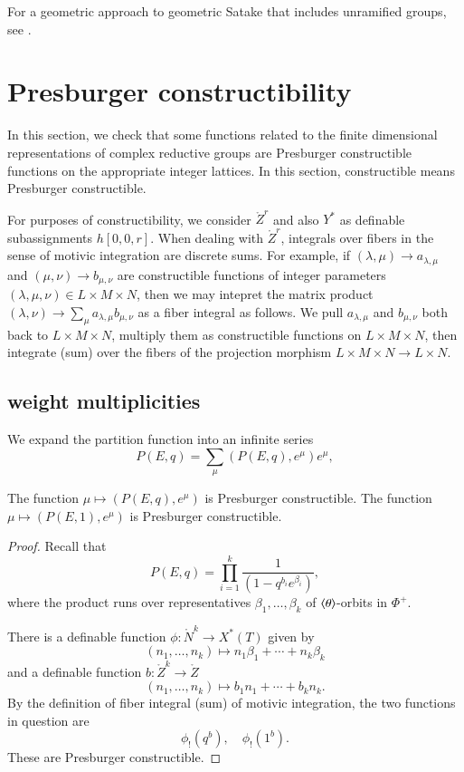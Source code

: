 For a geometric approach to geometric Satake that includes unramified groups, see \cite{zhu2011geometric}.


\newpage
\section{Presburger constructibility}

In this section,
we check that some functions related to the finite dimensional representations of complex reductive groups
are Presburger constructible functions on the appropriate integer lattices.  In this section, constructible means Presburger
constructible.

\begin{remark}\label{rem:matrix}
For purposes of constructibility, we consider $\ring{Z}^r$ and also $Y^*$ as 
definable subassignments $h[0,0,r]$. When dealing with $\ring{Z}^r$, integrals over fibers
in the sense of motivic integration are discrete sums.  For example, if $(\lambda,\mu)\to a_{\lambda,\mu}$
and $(\mu,\nu)\to b_{\mu,\nu}$ are constructible functions of integer parameters $(\lambda,\mu,\nu)\in L\times M\times N$,
then we may intepret the matrix product $(\lambda,\nu)\to \sum_{\mu} a_{\lambda,\mu} b_{\mu,\nu}$ as a
fiber integral as follows.  We pull $a_{\lambda,\mu}$ and $b_{\mu,\nu}$ both back to $L\times M\times N$, multiply
them as constructible functions on $L\times M\times N$, then integrate (sum) over the fibers of the projection morphism
$L\times M\times N\to L\times N$.
\end{remark}




\subsection{weight multiplicities}

We expand the partition function into an infinite series
\[
P(E,q) = \sum_\mu (P(E,q),e^\mu) e^{\mu},
\]

\begin{lemma}\label{lemma:partition}
The function $\mu\mapsto (P(E,q),e^\mu)$ is Presburger constructible.
The function $\mu\mapsto (P(E,1),e^\mu)$ is Presburger constructible.
\end{lemma}

\begin{proof} 
Recall that
\[
P(E,q) = \prod_{i=1}^k \frac{1}{ (1-q^{b_i} e^{\beta_i})},
\]
where the product runs over representatives $\beta_1,\ldots,\beta_k$ of $\langle{\theta}\rangle$-orbits in $\Phi^+$.

There is a definable function $\phi:\ring{N}^k\to X^*(T)$ given by
\[
(n_1,\ldots,n_k)\mapsto n_1 \beta_1+\cdots + n_k \beta_k
\]
and a definable function $b:\ring{Z}^k\to \ring{Z}$ 
\[
(n_1,\ldots,n_k)\mapsto b_1 n_1+\cdots + b_k n_k.
\]
By the definition of fiber integral (sum) of motivic integration,  the two  functions in question are
\[
\phi_! (q^b),\quad \phi_!(1^b).
\]
These are Presburger constructible.
\end{proof}

